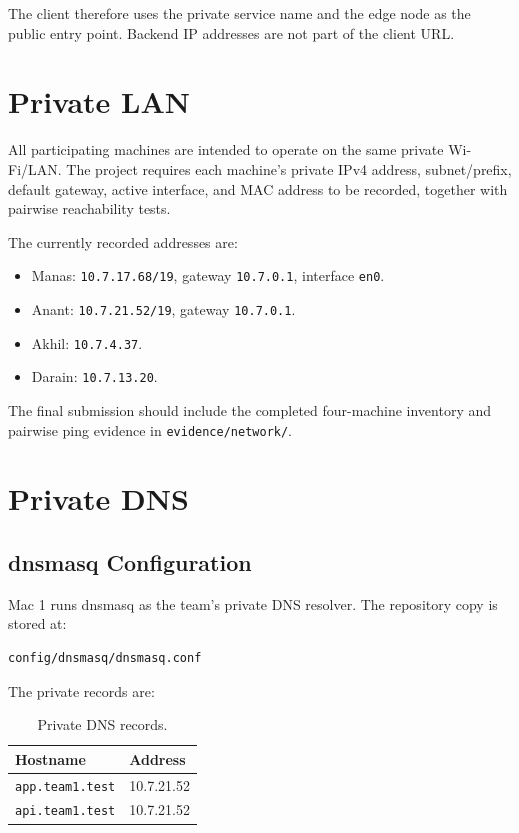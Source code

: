 \documentclass[11pt,a4paper]{article}
\begin{document}
The client therefore uses the private service name and the edge node as
the public entry point. Backend IP addresses are not part of the client
URL.

\section{Private LAN}

All participating machines are intended to operate on the same private
Wi-Fi/LAN. The project requires each machine's private IPv4 address,
subnet/prefix, default gateway, active interface, and MAC address to be
recorded, together with pairwise reachability tests.

The currently recorded addresses are:

\begin{itemize}
    \item Manas: \texttt{10.7.17.68/19}, gateway \texttt{10.7.0.1}, interface \texttt{en0}.
    \item Anant: \texttt{10.7.21.52/19}, gateway \texttt{10.7.0.1}.
    \item Akhil: \texttt{10.7.4.37}.
    \item Darain: \texttt{10.7.13.20}.
\end{itemize}

The final submission should include the completed four-machine inventory
and pairwise ping evidence in \texttt{evidence/network/}.

\section{Private DNS}

\subsection{dnsmasq Configuration}

Mac 1 runs dnsmasq as the team's private DNS resolver. The repository copy
is stored at:

\begin{lstlisting}
config/dnsmasq/dnsmasq.conf
\end{lstlisting}

The private records are:

\begin{table}[H]
\centering
\begin{tabular}{ll}
\toprule
\textbf{Hostname} & \textbf{Address} \\
\midrule
\texttt{app.team1.test} & 10.7.21.52 \\
\texttt{api.team1.test} & 10.7.21.52 \\
\bottomrule
\end{tabular}
\caption{Private DNS records.}
\end{table}
\end{document}

